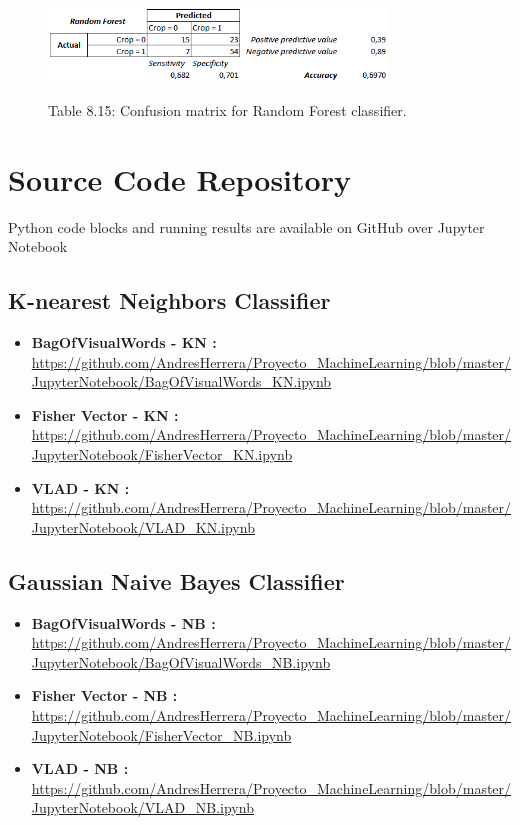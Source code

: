\documentclass[12pt]{article}
\numberwithin{equation}{section}
\numberwithin{table}{section}
\numberwithin{figure}{section}
\begin{document}
\begin{figure}[H] \centering
	\caption*{Table 8.15: Confusion matrix for Random Forest classifier. }
	\includegraphics[width=0.8\textwidth]{m15.png}
	\label{m15}
\end{figure}




\section{Source Code Repository}

Python code blocks and running results are available on GitHub over Jupyter Notebook

\subsection{K-nearest Neighbors Classifier }

\begin{itemize}
	\item {\textbf{BagOfVisualWords - KN :} } \url{https://github.com/AndresHerrera/Proyecto_MachineLearning/blob/master/JupyterNotebook/BagOfVisualWords_KN.ipynb}
	
	\item {\textbf{Fisher Vector - KN :} } \url{	https://github.com/AndresHerrera/Proyecto_MachineLearning/blob/master/JupyterNotebook/FisherVector_KN.ipynb}
	
	\item {\textbf{VLAD - KN :} } \url{	https://github.com/AndresHerrera/Proyecto_MachineLearning/blob/master/JupyterNotebook/VLAD_KN.ipynb}
		
\end{itemize}

\subsection{Gaussian Naive Bayes Classifier }

\begin{itemize}
	\item {\textbf{BagOfVisualWords - NB :} } \url{https://github.com/AndresHerrera/Proyecto_MachineLearning/blob/master/JupyterNotebook/BagOfVisualWords_NB.ipynb}
	
	\item {\textbf{Fisher Vector - NB :} } \url{	https://github.com/AndresHerrera/Proyecto_MachineLearning/blob/master/JupyterNotebook/FisherVector_NB.ipynb}
	
	\item {\textbf{VLAD - NB :} } \url{	https://github.com/AndresHerrera/Proyecto_MachineLearning/blob/master/JupyterNotebook/VLAD_NB.ipynb}
	
\end{itemize}
\end{document}
